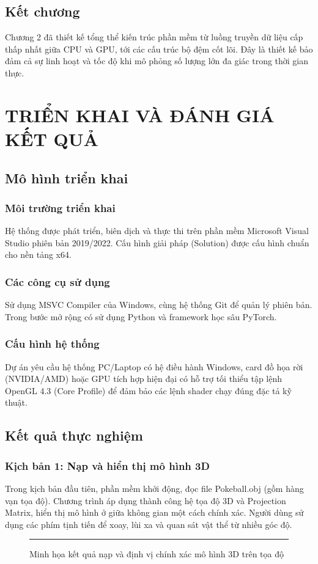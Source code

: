 \documentclass[13pt, a4paper]{extarticle}
\begin{document}
\subsection{Kết chương}
Chương 2 đã thiết kế tổng thể kiến trúc phần mềm từ luồng truyền dữ liệu cấp thấp nhất giữa CPU và GPU, tới các cấu trúc bộ đệm cốt lõi. Đây là thiết kế bảo đảm cả sự linh hoạt và tốc độ khi mô phỏng số lượng lớn đa giác trong thời gian thực.

\newpage
\section{TRIỂN KHAI VÀ ĐÁNH GIÁ KẾT QUẢ}

\subsection{Mô hình triển khai}
\subsubsection{Môi trường triển khai}
Hệ thống được phát triển, biên dịch và thực thi trên phần mềm Microsoft Visual Studio phiên bản 2019/2022. Cấu hình giải pháp (Solution) được cấu hình chuẩn cho nền tảng x64.

\subsubsection{Các công cụ sử dụng}
Sử dụng MSVC Compiler của Windows, cùng hệ thống Git để quản lý phiên bản. Trong bước mở rộng có sử dụng Python và framework học sâu PyTorch.

\subsubsection{Cấu hình hệ thống}
Dự án yêu cầu hệ thống PC/Laptop có hệ điều hành Windows, card đồ họa rời (NVIDIA/AMD) hoặc GPU tích hợp hiện đại có hỗ trợ tối thiểu tập lệnh OpenGL 4.3 (Core Profile) để đảm bảo các lệnh shader chạy đúng đặc tả kỹ thuật.

\subsection{Kết quả thực nghiệm}

\subsubsection{Kịch bản 1: Nạp và hiển thị mô hình 3D}
Trong kịch bản đầu tiên, phần mềm khởi động, đọc file Pokeball.obj (gồm hàng vạn tọa độ). Chương trình áp dụng thành công hệ tọa độ 3D và Projection Matrix, hiển thị mô hình ở giữa không gian một cách chính xác. Người dùng sử dụng các phím tịnh tiến để xoay, lùi xa và quan sát vật thể từ nhiều góc độ.
\begin{figure}[H] \centering \rule{10cm}{6cm} \caption{Minh họa kết quả nạp và định vị chính xác mô hình 3D trên tọa độ} \end{figure}
\end{document}
